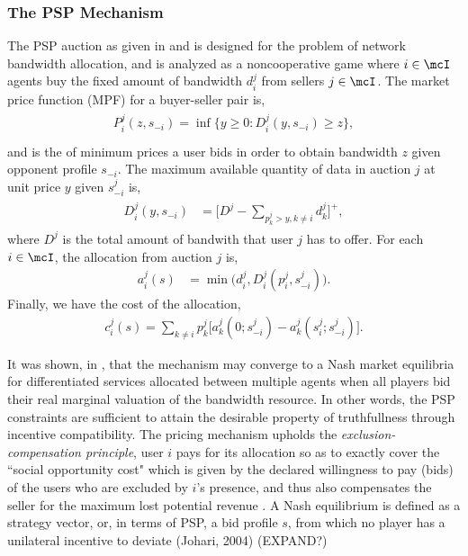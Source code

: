 \subsubsection{The PSP Mechanism}\label{mechanism}
The PSP auction as given in \cite{lazar} and \cite{semret} is designed for the
problem of network bandwidth allocation, and is analyzed as a noncooperative
game where $i\in\mcI$ agents buy the
fixed amount of bandwidth $d_i^j$ from sellers $j\in\mcI$.
The market price function (MPF) for a buyer-seller pair is,
\begin{align}\label{dataprice}
\begin{split}
    P_i^j(z, s_{-i})= \inf\bigg\lbrace y\ge 0 : D_i^j(y, s_{-i}) \ge z \bigg\rbrace,\\
\end{split}
\end{align}
and is the of minimum prices a user bids in
order to obtain bandwidth $z$ given opponent profile $s_{-i}$. 
The maximum available quantity of data in auction
$j$ at unit price $y$ given $s_{-i}^j$ is,
\begin{align}\label{datapriceinverse}
\begin{split}
    D_i^j(y, s_{-i}) &= \bigg[ D^j - \sum_{p_k^j>y,k\ne i} d_k^j  \bigg]^+,
\end{split}
\end{align}
where $D^j$ is the total amount of bandwith that user $j$ has to offer.
For each $i \in \mcI$, the allocation from auction $j$ is,
\begin{align}\label{dataallocation}
    a_i^j(s) &= \min\bigg( d_i^j, 
    D_i^j(p_i^j,s_{-i}^j)\bigg).
\end{align}
Finally, we have the cost of the allocation,
\begin{align}\label{datacost}
    c_i^j(s) = \displaystyle\sum_{k\ne i} 
p_k^j \big[a_k^j(0; s_{-i}^j)
    -a_k^j(s_i^j;s_{-i}^j)\big].
\end{align}

It was shown, in \cite{lazar}, that the mechanism may converge to a Nash market
equilibria for differentiated services
allocated between multiple agents when all players bid their real marginal valuation
of the bandwidth resource. In other words, the PSP constraints are
sufficient to attain the desirable property of truthfullness through incentive
compatibility. The pricing mechanism upholds the \emph{exclusion-compensation
principle}, user $i$
pays for its allocation so as to exactly cover the ``social opportunity cost"
which is given by the declared willingness to pay (bids) of the users who are
excluded by $i$'s presence, and thus also compensates the seller for the maximum lost potential
revenue \cite{lazar}.
{
A Nash equilibrium is defined as a strategy vector, or, in terms of PSP, a bid
profile $s$,
from which no player has a unilateral incentive to deviate (Johari, 2004)
(EXPAND?)
}\\

